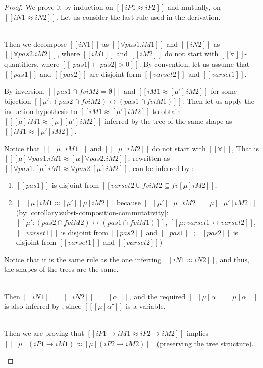 \lemmaDeclEquivBijection*
\begin{proof}
  We prove it by induction on $[[iP1 ≈ iP2]]$ and mutually, on $[[iN1 ≈ iN2]]$.
  Let us consider the last rule used in the derivation.
  \begin{caseof}
    \item {}\\
      Then we decompose $[[iN1]]$ as $[[∀pas1.iM1]]$ and $[[iN2]]$ as $[[∀pas2.iM2]]$,
      where $[[iM1]]$ and $[[iM2]]$ do not start with $[[∀]]$-quantifiers.
      where $[[|pas1| + |pas2| > 0]]$.
      By convention, let us assume that
      $[[pas1]]$ and $[[pas2]]$ are disjoint form 
      $[[varset2]]$ and $[[varset1]]$.

      By inversion, $[[{pas1} ∩ fv iM2 = ∅]]$ and 
      $[[iM1 ≈ [μ'] iM2]]$ for some bijection
      $[[μ' : ({pas2} ∩ fv iM2) ↔ ({pas1} ∩ fv iM1)]]$.
      Then let us apply the induction hypothesis to
       $[[iM1 ≈ [μ'] iM2]]$ to obtain $[[ [μ]iM1 ≈ [μ] [μ'] iM2 ]]$ 
      inferred by the tree of the same shape as 
      $[[ iM1 ≈ [μ'] iM2 ]]$.

      Notice that $[[ [μ]iM1 ]]$ and $[[ [μ]iM2 ]]$ 
      do not start with $[[∀]]$, 
      That is $[[ [μ]∀pas1.iM1 ≈ [μ]∀pas2.iM2]]$, 
      rewritten as $[[ ∀pas1.[μ]iM1 ≈ ∀pas2.[μ]iM2]]$,
      can be inferred by :
      \begin{enumerate}
        \item $[[{pas1}]]$ is disjoint from 
        $[[varset2 ∪ fv iM2 ⊆ fv [μ]iM2 ]]$;
        \item $[[ [μ]iM1 ≈ [μ'] [μ] iM2 ]]$
          because $[[ [μ'] [μ] iM2 = [μ] [μ'] iM2 ]]$
          (by \cref{corollary:subst-composition-commutativity}:
          $[[μ' : ({pas2} ∩ fv iM2) ↔ ({pas1} ∩ fv iM1)]]$, 
          $[[μ : varset1 ↔ varset2]]$,
          $[[varset1]]$ is disjoint from 
          $[[pas2]]$ and $[[pas1]]$; 
          $[[pas2]]$ is disjoint from $[[varset1]]$ and $[[varset2]]$)
      \end{enumerate}
      Notice that it is the same rule as the one inferring 
      $[[iN1 ≈ iN2]]$, and thus, the shapes of the trees are the same.

    \item {}\\
      Then $[[iN1]] = [[iN2]] = [[α⁻]]$, and the required
      $[[ [μ]α⁻ = [μ]α⁻ ]]$ is also inferred by
      , since 
      $[[ [μ]α⁻ ]]$ is a variable.
    \item {}\\
      Then we are proving 
      that $[[iP1 → iM1 ≈ iP2 → iM2]]$ implies
      $[[ [μ](iP1 → iM1) ≈ [μ](iP2 → iM2) ]]$ 
      (preserving the tree structure).


\end{caseof}
\end{proof}
